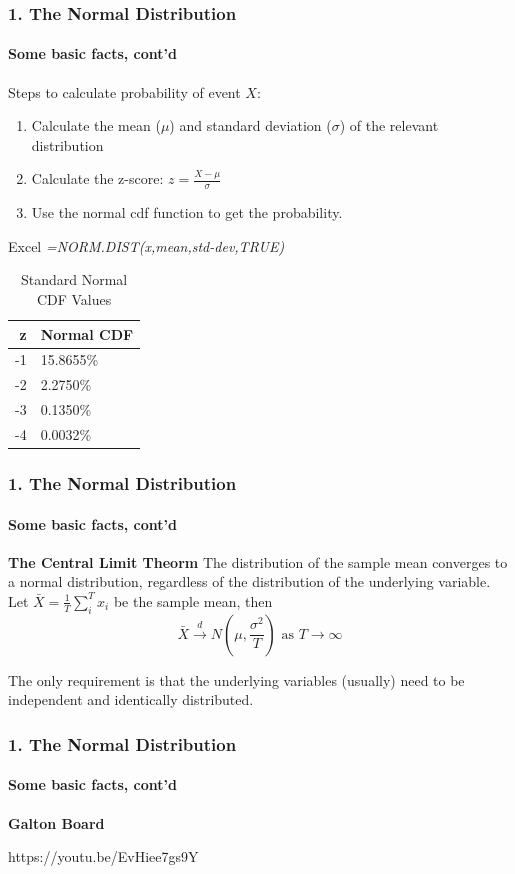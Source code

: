 \documentclass{beamer}
\begin{document}
\begin{foundframe}[t]
    \frametitle{1. The Normal Distribution}
    \framesubtitle{Some basic facts, cont'd}

    Steps to calculate probability of event $X$:
    \begin{enumerate}
        \item Calculate the mean ($\mu$) and standard deviation ($\sigma$) of the relevant distribution
        \item Calculate the z-score: $z = \frac{X-\mu}{\sigma}$
        \item Use the normal cdf function to get the probability. 
    \end{enumerate}
      Excel \textit{=NORM.DIST(x,mean,std-dev,TRUE)} 
     


    
    \footnotesize
    \begin{table}
        \caption{Standard Normal CDF Values}
        \begin{tabular}{rl}
        \toprule
        z & Normal CDF \\
        \midrule
        -1 & 15.8655\% \\
        -2 & 2.2750\% \\
        -3 & 0.1350\% \\
        -4 & 0.0032\% \\
        \bottomrule
        \end{tabular}
    \end{table}

\end{foundframe}


\begin{foundframe}[t]
    \frametitle{1. The Normal Distribution}
    \framesubtitle{Some basic facts, cont'd}

    \textbf{The Central Limit Theorm}
    The distribution of the sample mean converges to a normal distribution, regardless of the distribution of the underlying variable.
    \vspace{1em}
    Let $\bar{X} = \frac{1}{T}\sum_i^Tx_i$ be the sample mean, then
    $$\bar{X} \xrightarrow{d} N\left(\mu, \frac{\sigma^2}{T}\right) \text{ as } T \to \infty$$

    The only requirement is that the underlying variables (usually) need to be independent and identically distributed.

\end{foundframe}

\begin{foundframe}[t]
    \frametitle{1. The Normal Distribution}
    \framesubtitle{Some basic facts, cont'd}

    \textbf{Galton Board}\\
    \vspace{2em}

    https://youtu.be/EvHiee7gs9Y

\end{foundframe}
\end{document}
